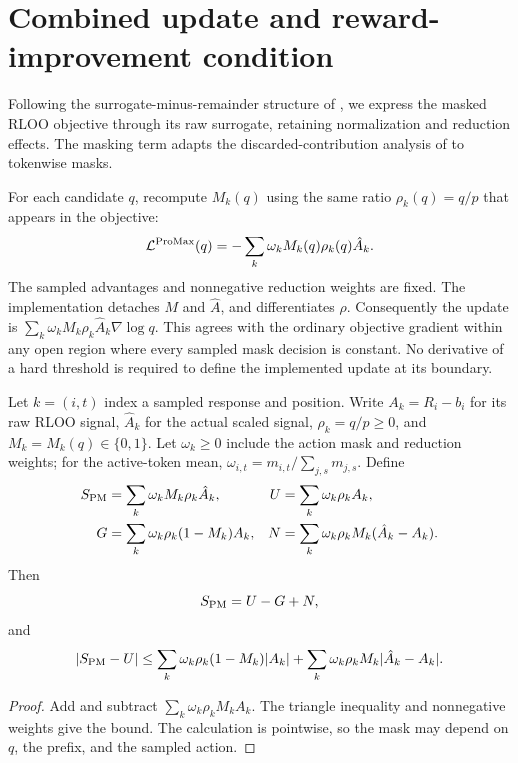 \section{Combined update and reward-improvement condition}
\label{sec:unified}
\label{sec:population-transfer}

Following the surrogate-minus-remainder structure of
\citet{qi2026rethinkingtrustregionllm,li2025trm}, we express the masked
RLOO objective through its raw surrogate, retaining normalization and
reduction effects. The masking term adapts the discarded-contribution
analysis of \citet[Section~1.3]{li2025sequencemasking} to tokenwise masks.

For each candidate $q$, recompute $M_k(q)$ using the same ratio
$\rho_k(q)=q/p$ that appears in the objective:
\begin{equation}
 \mathcal L^{\rm ProMax}(q)=-\sum_k\omega_kM_k(q)\rho_k(q)\hat A_k.
 \label{eq:promax-loss}
\end{equation}
The sampled advantages and nonnegative reduction weights are fixed.
The implementation detaches $M$ and $\hat A$, and differentiates $\rho$.
Consequently the update is
$\sum_k\omega_kM_k\rho_k\hat A_k\nabla\log q$.
This agrees with the ordinary objective gradient within any open region
where every sampled mask decision is constant. No derivative of a hard
threshold is required to define the implemented update at its boundary.

\begin{proposition}
\label{prop:promax-objective-split}
Let $k=(i,t)$ index a sampled response and position. Write $A_k=R_i-b_i$
for its raw RLOO signal, $\hat A_k$ for the actual scaled signal,
$\rho_k=q/p\ge0$, and $M_k=M_k(q)\in\{0,1\}$.
Let $\omega_k\ge0$ include the action mask and reduction weights;
for the active-token mean, $\omega_{i,t}=m_{i,t}/\sum_{j,s}m_{j,s}$.
Define
\begin{align*}
 S_{\rm PM}&=\sum_k\omega_kM_k\rho_k\hat A_k,&
 U&=\sum_k\omega_k\rho_k A_k,\\
 G&=\sum_k\omega_k\rho_k(1-M_k)A_k,&
 N&=\sum_k\omega_k\rho_k M_k(\hat A_k-A_k).
\end{align*}
Then
\begin{equation}
 S_{\rm PM}=U-G+N,
 \label{eq:promax-objective-split}
\end{equation}
and
\[
 |S_{\rm PM}-U|\le\sum_k\omega_k\rho_k(1-M_k)|A_k|
 +\sum_k\omega_k\rho_kM_k|\hat A_k-A_k|.
\]
\end{proposition}
\begin{proof}
Add and subtract $\sum_k\omega_k\rho_kM_k A_k$.
The triangle inequality and nonnegative weights give the bound.
The calculation is pointwise, so the mask may depend on $q$, the prefix,
and the sampled action.
\end{proof}

